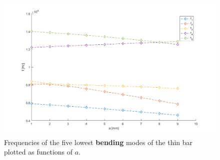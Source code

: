 \documentclass[a4paper]{article}
\begin{document}
\begin{figure}[h]
	\centering
	\includegraphics[width=0.85\linewidth]{freqz.png}
	\caption{Frequencies of the five lowest \textbf{bending} modes of the thin bar plotted as functions of $a$.}
	\label{fig:threqz}
\end{figure}
\end{document}
